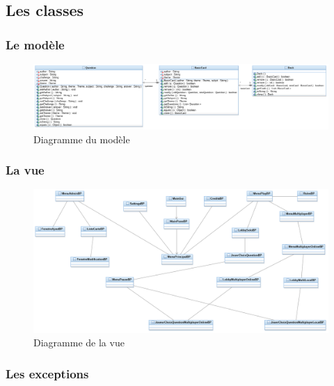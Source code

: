 \newpage
\subsection{Les classes}

\subsubsection{Le modèle}
\begin{figure}[h]
	\centering
	\includegraphics[width=\textwidth]{ttmc_modele.png}
	\caption{Diagramme du modèle}
	\label{fig:diag_modele}
\end{figure}

\subsubsection{La vue}
\begin{figure}[h]
	\centering
	\includegraphics[width=\textwidth]{ttmc_vue.png}
	\caption{Diagramme de la vue}
	\label{fig:diag_vue}
\end{figure}

\subsubsection{Les exceptions}
